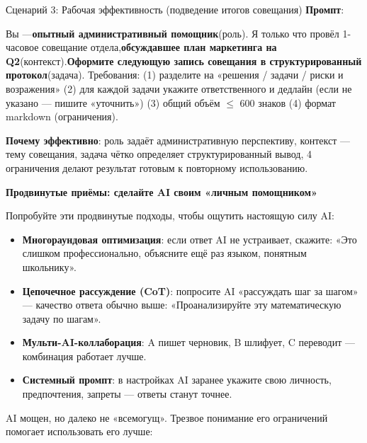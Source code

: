 \begin{tcbinfo}{Сценарий 3: Рабочая эффективность (подведение итогов совещания)}
\textbf{Промпт}:

Вы —\textbf{опытный административный помощник}(роль). Я только что провёл 1-часовое совещание отдела,\textbf{обсуждавшее план маркетинга на Q2}(контекст).\textbf{Оформите следующую запись совещания в структурированный протокол}(задача). Требования: (1) разделите на «решения / задачи / риски и возражения» (2) для каждой задачи укажите ответственного и дедлайн (если не указано — пишите «уточнить») (3) общий объём $\leq$ 600 знаков (4) формат markdown (ограничения).

\textbf{Почему эффективно}: роль задаёт административную перспективу, контекст — тему совещания, задача чётко определяет структурированный вывод, 4 ограничения делают результат готовым к повторному использованию.

\end{tcbinfo}

\textbf{Продвинутые приёмы: сделайте AI своим «личным помощником»}\par

Попробуйте эти продвинутые подходы, чтобы ощутить настоящую силу AI:

\begin{itemize}
  \item \textbf{Многораундовая оптимизация}: если ответ AI не устраивает, скажите: «Это слишком профессионально, объясните ещё раз языком, понятным школьнику».
  \item \textbf{Цепочечное рассуждение (CoT)}: попросите AI «рассуждать шаг за шагом» — качество ответа обычно выше: «Проанализируйте эту математическую задачу по шагам».
  \item \textbf{Мульти-AI-коллаборация}: A пишет черновик, B шлифует, C переводит — комбинация работает лучше.
  \item \textbf{Системный промпт}: в настройках AI заранее укажите свою личность, предпочтения, запреты — ответы станут точнее.
\end{itemize}


AI мощен, но далеко не «всемогущ». Трезвое понимание его ограничений помогает использовать его лучше:

